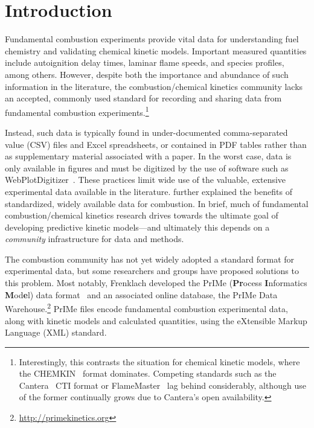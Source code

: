 \documentclass[12pt]{ijck}
\begin{document}
\section{Introduction}
%
Fundamental combustion experiments provide vital data for understanding fuel
chemistry and validating chemical kinetic models. Important measured quantities
include autoignition delay times, laminar flame speeds, and species profiles,
among others. However, despite both the importance and abundance of such
information in the literature, the combustion\slash chemical kinetics community
lacks an accepted, commonly used standard for recording and sharing data from
fundamental combustion experiments.\footnote{Interestingly, this contrasts the
situation for chemical kinetic models, where the CHEMKIN~\autocite{Kee:1996ck}
format dominates. Competing standards such as the
Cantera~\autocite{Cantera:2.3.0} CTI format or
FlameMaster~\autocite{FlameMaster:ref} lag behind considerably,
although use of the former continually grows due to Cantera's open availability.
}

Instead, such data is typically found in under-documented comma-separated value
(CSV) files and Excel spreadsheets, or contained in PDF tables rather than as
supplementary material associated with a paper. In the worst case, data is only
available in figures and must be digitized by the use of software such as
WebPlotDigitizer~\autocite{WebPlotDigitizer}. These practices limit wide use
of the valuable, extensive experimental data available in the literature.
\textcite{Frenklach:2007bm} further explained the benefits of standardized,
widely available data for combustion. In brief, much of fundamental
combustion\slash chemical kinetics research drives towards the ultimate goal of
developing predictive kinetic models---and ultimately this depends on a
\emph{community} infrastructure for data and methods.

The combustion community has not yet widely adopted a standard format for
experimental data, but some researchers and groups have proposed solutions to
this problem. Most notably, Frenklach developed the PrIMe (\textbf{Pr}ocess
\textbf{I}nformatics \textbf{M}od\textbf{e}l) data
format~\autocite{Frenklach:2007bm,You:2011hy} and an associated online database,
the PrIMe Data Warehouse.\footnote{\url{http://primekinetics.org}}
PrIMe files encode fundamental
combustion experimental data, along with kinetic models and calculated
quantities, using the eXtensible Markup Language (XML) standard.
\end{document}
